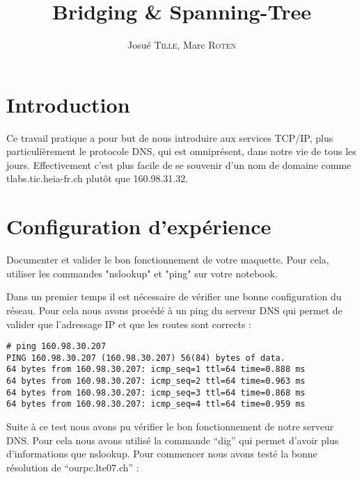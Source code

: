 \documentclass[a4paper, 12pt]{article}
\begin{document}
\pagestyle{empty} %

\title{Bridging \& Spanning-Tree}
\author{Josué \textsc{Tille}, Marc \textsc{Roten}}
\def\branche{Réseaux IP}
\def\subtitle{Rapport de travail pratique}



\tableofcontents
\cleardoublepage

\pagestyle{fancy}

\section{Introduction}
Ce travail pratique a pour but de nous introduire aux services TCP/IP, plus particulièrement le protocole DNS, qui est omniprésent, dans notre vie de tous les jours. Effectivement c'est plus facile de se souvenir d'un nom de domaine comme tlabs.tic.heia-fr.ch plutôt que 160.98.31.32.

\section{Configuration d'expérience}
\begin{question}
\item Documenter et valider le bon fonctionnement de votre maquette. Pour cela, utiliser les commandes "nslookup" et "ping" sur votre notebook.
\end{question}

Dans un premier temps il est nécessaire de vérifier une bonne configuration du réseau. Pour cela nous avons procédé à un ping du serveur DNS qui permet de valider que l'adressage IP et que les routes sont corrects :
\begin{lstlisting}
# ping 160.98.30.207               
PING 160.98.30.207 (160.98.30.207) 56(84) bytes of data.
64 bytes from 160.98.30.207: icmp_seq=1 ttl=64 time=0.888 ms
64 bytes from 160.98.30.207: icmp_seq=2 ttl=64 time=0.963 ms
64 bytes from 160.98.30.207: icmp_seq=3 ttl=64 time=0.868 ms
64 bytes from 160.98.30.207: icmp_seq=4 ttl=64 time=0.959 ms
\end{lstlisting}

Suite à ce test nous avons pu vérifier le bon fonctionnement de notre serveur DNS. Pour cela nous avons utilisé la commande ``dig'' qui permet d'avoir plus d'informations que nslookup. Pour commencer nous avons testé la bonne résolution de ``ourpc.lte07.ch'' :
\end{document}
